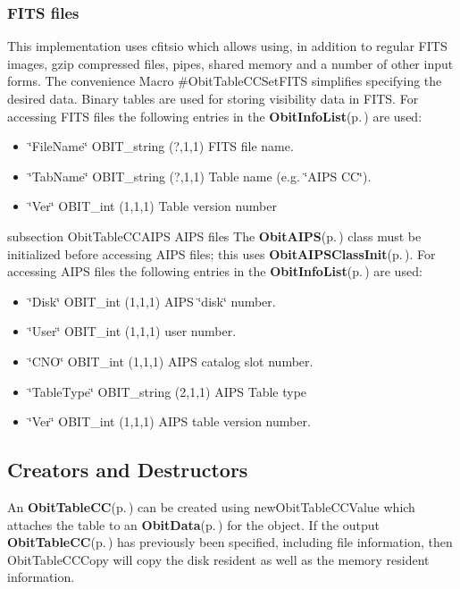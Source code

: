 \subsubsection{FITS files}\label{ObitTableWX_8h_TableFITS}
This implementation uses cfitsio which allows using, in addition to regular FITS images, gzip compressed files, pipes, shared memory and a number of other input forms. The convenience Macro \#Obit\-Table\-CCSet\-FITS simplifies specifying the desired data. Binary tables are used for storing visibility data in FITS. For accessing FITS files the following entries in the {\bf Obit\-Info\-List}{\rm (p.\,\pageref{structObitInfoList})} are used: \begin{itemize}
\item \char`\"{}File\-Name\char`\"{} OBIT\_\-string (?,1,1) FITS file name. \item \char`\"{}Tab\-Name\char`\"{} OBIT\_\-string (?,1,1) Table name (e.g. \char`\"{}AIPS CC\char`\"{}). \item \char`\"{}Ver\char`\"{} OBIT\_\-int (1,1,1) Table version number\end{itemize}
subsection Obit\-Table\-CCAIPS AIPS files The {\bf Obit\-AIPS}{\rm (p.\,\pageref{structObitAIPS})} class must be initialized before accessing AIPS files; this uses {\bf Obit\-AIPSClass\-Init}{\rm (p.\,\pageref{ObitAIPS_8c_a5})}. For accessing AIPS files the following entries in the {\bf Obit\-Info\-List}{\rm (p.\,\pageref{structObitInfoList})} are used: \begin{itemize}
\item \char`\"{}Disk\char`\"{} OBIT\_\-int (1,1,1) AIPS \char`\"{}disk\char`\"{} number. \item \char`\"{}User\char`\"{} OBIT\_\-int (1,1,1) user number. \item \char`\"{}CNO\char`\"{} OBIT\_\-int (1,1,1) AIPS catalog slot number. \item \char`\"{}Table\-Type\char`\"{} OBIT\_\-string (2,1,1) AIPS Table type \item \char`\"{}Ver\char`\"{} OBIT\_\-int (1,1,1) AIPS table version number.\end{itemize}
\subsection{Creators and Destructors}\label{ObitTableCC_8h_ObitTableCCaccess}
An {\bf Obit\-Table\-CC}{\rm (p.\,\pageref{structObitTableCC})} can be created using new\-Obit\-Table\-CCValue which attaches the table to an {\bf Obit\-Data}{\rm (p.\,\pageref{structObitData})} for the object. If the output {\bf Obit\-Table\-CC}{\rm (p.\,\pageref{structObitTableCC})} has previously been specified, including file information, then Obit\-Table\-CCCopy will copy the disk resident as well as the memory resident information.

